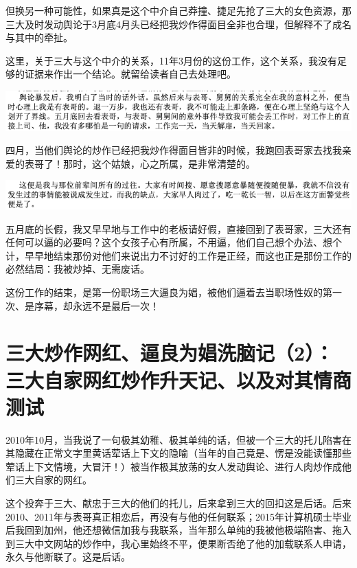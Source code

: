 \documentclass[9pt, b5paper]{article}
\begin{document}
但换另一种可能性，如果真是这个中介自己莽撞、捷足先抢了三大的女色资源，那三大及时发动舆论于3月底4月头已经把我炒作得面目全非也合理，但解释不了成名与其中的牵扯。

这里，关于三大与这个中介的关系，11年3月份的这份工作，这个关系，我没有足够的证据来作出一个结论。就留给读者自己去处理吧。

\begin{center}
\includegraphics[width=.9\linewidth]{./pic/backups_plans_20210412_104930.png}
\end{center}

四月，当他们舆论的炒作已经把我炒作得面目皆非的时候，我跑回表哥家去找我亲爱的表哥了！那时，这个姑娘，心之所属，是非常清楚的。

\begin{center}
\includegraphics[width=.9\linewidth]{./pic/backups_plans_20210412_104959.png}
\end{center}

五月底的长假，我又早早地与工作中的老板请好假，直接回到了表哥家，三大还有任何可以逼的必要吗？这个女孩子心有所属，不用逼，他们自己想个办法、想个计，早早地结束那份对他们来说出力不讨好的工作是正经，而这也正是那份工作的必然结局：我被炒掉、无需废话。 

这份工作的结束，是第一份职场三大逼良为娼，被他们逼着去当职场性奴的第一次、是序幕，却永远不是最后一次！

\section{三大炒作网红、逼良为娼洗脑记（2）：三大自家网红炒作升天记、以及对其情商测试}
\label{sec:org1cd11f4}

2010年10月，当我说了一句极其幼稚、极其单纯的话，但被一个三大的托儿陷害在其隐藏在正常文字里黄话荤话上下文的隐喻（当年的自己竟是、愣是没能读懂那些荤话上下文情境，大冒汗！）被当作极其放荡的女人发动舆论、进行人肉炒作成他们三大自家的网红。

这个投奔于三大、献忠于三大的他们的托儿，后来拿到三大的回扣这是后话。后来2010、2011年与表哥真正相恋后，再没有与他的任何联系；2015年计算机硕士毕业后我回到加州，他还想微信加我与我联系，当年那么单纯的我被他极端陷害、拖入到三大中文网站的炒作中，我心里始终不平，便果断否绝了他的加载联系人申请，永久与他断联了。这是后话。 
\end{document}
